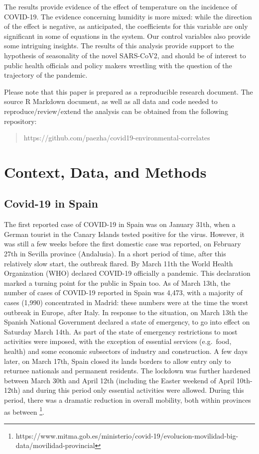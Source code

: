 \documentclass[]{elsarticle} %
\begin{document}
The results provide evidence of the effect of temperature on the
incidence of COVID-19. The evidence concerning humidity is more mixed:
while the direction of the effect is negative, as anticipated, the
coefficients for this variable are only significant in some of equations
in the system. Our control variables also provide some intriguing
insights. The results of this analysis provide support to the hypothesis
of seasonality of the novel SARS-CoV2, and should be of interest to
public health officials and policy makers wrestling with the question of
the trajectory of the pandemic.

Please note that this paper is prepared as a reproducible research
document. The source R Markdown document, as well as all data and code
needed to reproduce/review/extend the analysis can be obtained from the
following repository:

\begin{quote}
https://github.com/paezha/covid19-environmental-correlates
\end{quote}

\hypertarget{context-data-and-methods}{%
\section{Context, Data, and Methods}\label{context-data-and-methods}}

\hypertarget{covid-19-in-spain}{%
\subsection{Covid-19 in Spain}\label{covid-19-in-spain}}

The first reported case of COVID-19 in Spain was on January 31th, when a
German tourist in the Canary Islands tested positive for the virus.
However, it was still a few weeks before the first domestic case was
reported, on February 27th in Sevilla province (Andalusia). In a short
period of time, after this relatively slow start, the outbreak flared.
By March 11th the World Health Organization (WHO) declared COVID-19
officially a pandemic. This declaration marked a turning point for the
public in Spain too. As of March 13th, the number of cases of COVID-19
reported in Spain was 4,473, with a majority of cases (1,990)
concentrated in Madrid: these numbers were at the time the worst
outbreak in Europe, after Italy. In response to the situation, on March
13th the Spanish National Government declared a state of emergency, to
go into effect on Saturday March 14th. As part of the state of emergency
restrictions to most activities were imposed, with the exception of
essential services (e.g.~food, health) and some economic subsectors of
industry and construction. A few days later, on March 17th, Spain closed
its lands borders to allow entry only to returnee nationals and
permanent residents. The lockdown was further hardened between March
30th and April 12th (including the Easter weekend of April 10th-12th)
and during this period only essential activities were allowed. During
this period, there was a dramatic reduction in overall mobility, both
within provinces as between
\footnote{https://www.mitma.gob.es/ministerio/covid-19/evolucion-movilidad-big-data/movilidad-provincial}.
\end{document}

